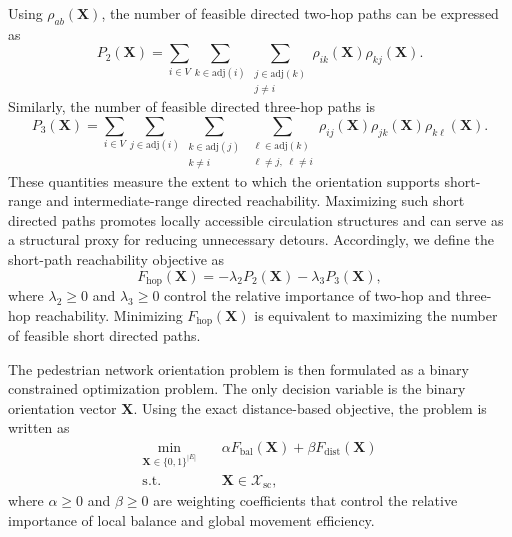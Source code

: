 \documentclass[twocolumn,a4paper]{article} %
\begin{document}
Using \(\rho_{ab}(\mathbf{X})\), the number of feasible directed two-hop paths can be expressed as
\begin{equation}
    P_2(\mathbf{X})
    =
    \sum_{i\in V}
    \sum_{k\in \mathrm{adj}(i)}
    \sum_{\substack{j\in \mathrm{adj}(k)\\j\neq i}}
    \rho_{ik}(\mathbf{X})
    \rho_{kj}(\mathbf{X}).
\end{equation}
Similarly, the number of feasible directed three-hop paths is
\begin{equation}
    P_3(\mathbf{X})
    =
    \sum_{i\in V}
    \sum_{j\in \mathrm{adj}(i)}
    \sum_{\substack{k\in \mathrm{adj}(j)\\k\neq i}}
    \sum_{\substack{\ell\in \mathrm{adj}(k)\\\ell\neq j,\;\ell\neq i}}
    \rho_{ij}(\mathbf{X})
    \rho_{jk}(\mathbf{X})
    \rho_{k\ell}(\mathbf{X}).
\end{equation}
These quantities measure the extent to which the orientation supports short-range and intermediate-range directed reachability. Maximizing such short directed paths promotes locally accessible circulation structures and can serve as a structural proxy for reducing unnecessary detours. Accordingly, we define the short-path reachability objective as
\begin{equation}
    F_{\mathrm{hop}}(\mathbf{X})
    =
    -\lambda_2 P_2(\mathbf{X})
    -
    \lambda_3 P_3(\mathbf{X}),
\end{equation}
where \(\lambda_2\geq 0\) and \(\lambda_3\geq 0\) control the relative importance of two-hop and three-hop reachability. Minimizing \(F_{\mathrm{hop}}(\mathbf{X})\) is equivalent to maximizing the number of feasible short directed paths.

The pedestrian network orientation problem is then formulated as a binary constrained optimization problem. The only decision variable is the binary orientation vector \(\mathbf{X}\). Using the exact distance-based objective, the problem is written as
\begin{equation}
\begin{aligned}
    \min_{\mathbf{X}\in\{0,1\}^{|E|}}
    \quad &
    \alpha F_{\mathrm{bal}}(\mathbf{X})
    +
    \beta F_{\mathrm{dist}}(\mathbf{X})
    \\
    \mathrm{s.t.}
    \quad &
    \mathbf{X}\in\mathcal{X}_{\mathrm{sc}},
\end{aligned}
\end{equation}
where \(\alpha\geq 0\) and \(\beta\geq 0\) are weighting coefficients that control the relative importance of local balance and global movement efficiency.
\end{document}
